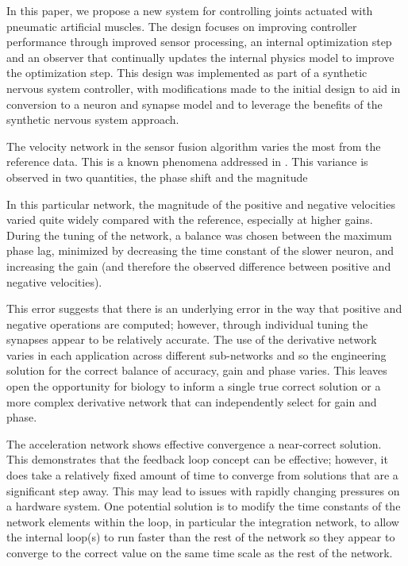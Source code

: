 \label{chap:discussion}

In this paper, we propose a new system for controlling joints actuated with
pneumatic artificial muscles. The design focuses on improving controller
performance through improved sensor processing, an internal optimization step
and an observer that continually updates the internal physics model to improve
the optimization step. This design was implemented as part of a synthetic
nervous system controller, with modifications made to the initial design to aid
in conversion to a neuron and synapse model and to leverage the benefits of the
synthetic nervous system approach.


The velocity network in the sensor fusion algorithm varies the most from the
reference data. This is a known phenomena addressed in
\cite{NickFunctionalSubnetwork}. This variance is observed in two quantities,
the phase shift and the magnitude

In this particular network, the magnitude of the positive and negative
velocities varied quite widely compared with the reference, especially at
higher gains. During the tuning of the network, a balance was chosen between
the maximum phase lag, minimized by decreasing the time constant of the slower
neuron, and increasing the gain (and therefore the observed difference between
positive and negative velocities).

This error suggests that there is an underlying error in the way that positive
and negative operations are computed; however, through individual tuning the
synapses appear to be relatively accurate. The use of the derivative network
varies in each application across different sub-networks and so the engineering
solution for the correct balance of accuracy, gain and phase varies. This
leaves open the opportunity for biology to inform a single true correct
solution or a more complex derivative network that can independently select for
gain and phase.


The acceleration network shows effective convergence a near-correct solution.
This demonstrates that the feedback loop concept can be effective; however, it
does take a relatively fixed amount of time to
converge from solutions that are a significant step away. This may lead to
issues with rapidly changing pressures on a hardware system. One potential
solution is to modify the time constants of the network
elements within the loop, in particular the integration network, to allow the
internal loop(s) to run faster than the rest of the network
so they appear to converge to the correct value on the same time scale as the
rest of the network.

